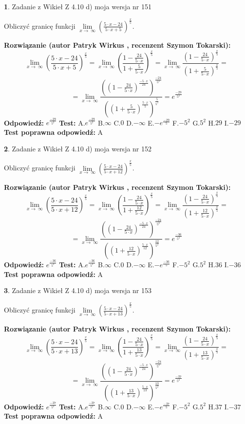 \documentclass[12pt, a4paper]{article}
\theoremstyle{definition} %
\newtheorem{zad}{}
\newcommand{\zadStart}[1]{\begin{zad}#1\newline}
\newcommand{\zadStop}{\end{zad}}
\newcommand{\rozwStart}[2]{\noindent \textbf{Rozwiązanie (autor #1 , recenzent #2): }\newline}
\newcommand{\rozwStop}{\newline}
\newcommand{\odpStart}{\noindent \textbf{Odpowiedź:}\newline}
\newcommand{\odpStop}{\newline}
\newcommand{\testStart}{\noindent \textbf{Test:}\newline}
\newcommand{\testStop}{\newline}
\newcommand{\kluczStart}{\noindent \textbf{Test poprawna odpowiedź:}\newline}
\newcommand{\kluczStop}{\newline}
\begin{document}
\zadStart{Zadanie z Wikieł Z 4.10 d) moja wersja nr 151}


Obliczyć granicę funkcji  $\lim\limits_{x\to\ \infty}(\frac{5\cdot x-24}{5\cdot x+5})^{\frac{x}{5}}$.
\zadStop
\rozwStart{Patryk Wirkus}{Szymon Tokarski}
$$\lim\limits_{x\to\ \infty}(\frac{5\cdot x-24}{5\cdot x+5})^{\frac{x}{5}} = \lim\limits_{x\to\ \infty}(\frac{1-\frac{24}{5\cdot x}}{1+\frac{5}{5\cdot x}})^{\frac{x}{5}}=\lim\limits_{x\to\ \infty}\frac{(1-\frac{24}{5\cdot x})^{\frac{x}{5}}}{(1+\frac{5}{5\cdot x})^{\frac{x}{5}}}=$$
$$=\lim\limits_{x\to\ \infty}\frac{((1-\frac{24}{5\cdot x})^{\frac{-5\cdot x}{24}})^{\frac{-24}{5^{2}}}}{((1+\frac{5}{5\cdot x})^{\frac{5\cdot x}{5}})^{\frac{5}{5^{2}}}}=e^{\frac{-29}{5^{2}}}$$
\rozwStop
\odpStart
$e^{\frac{-29}{5^{2}}}$
\odpStop
\testStart
A.$e^{\frac{-29}{5^{2}}}$ B.$\infty$ C.$0$ D.$-\infty$ E.$-e^{\frac{-29}{5}}$
F.$-5^{2}$ G.$5^{2}$
H.$29$
I.$-29$
\testStop
\kluczStart
A
\kluczStop



\zadStart{Zadanie z Wikieł Z 4.10 d) moja wersja nr 152}


Obliczyć granicę funkcji  $\lim\limits_{x\to\ \infty}(\frac{5\cdot x-24}{5\cdot x+12})^{\frac{x}{5}}$.
\zadStop
\rozwStart{Patryk Wirkus}{Szymon Tokarski}
$$\lim\limits_{x\to\ \infty}(\frac{5\cdot x-24}{5\cdot x+12})^{\frac{x}{5}} = \lim\limits_{x\to\ \infty}(\frac{1-\frac{24}{5\cdot x}}{1+\frac{12}{5\cdot x}})^{\frac{x}{5}}=\lim\limits_{x\to\ \infty}\frac{(1-\frac{24}{5\cdot x})^{\frac{x}{5}}}{(1+\frac{12}{5\cdot x})^{\frac{x}{5}}}=$$
$$=\lim\limits_{x\to\ \infty}\frac{((1-\frac{24}{5\cdot x})^{\frac{-5\cdot x}{24}})^{\frac{-24}{5^{2}}}}{((1+\frac{12}{5\cdot x})^{\frac{5\cdot x}{12}})^{\frac{12}{5^{2}}}}=e^{\frac{-36}{5^{2}}}$$
\rozwStop
\odpStart
$e^{\frac{-36}{5^{2}}}$
\odpStop
\testStart
A.$e^{\frac{-36}{5^{2}}}$ B.$\infty$ C.$0$ D.$-\infty$ E.$-e^{\frac{-36}{5}}$
F.$-5^{2}$ G.$5^{2}$
H.$36$
I.$-36$
\testStop
\kluczStart
A
\kluczStop



\zadStart{Zadanie z Wikieł Z 4.10 d) moja wersja nr 153}


Obliczyć granicę funkcji  $\lim\limits_{x\to\ \infty}(\frac{5\cdot x-24}{5\cdot x+13})^{\frac{x}{5}}$.
\zadStop
\rozwStart{Patryk Wirkus}{Szymon Tokarski}
$$\lim\limits_{x\to\ \infty}(\frac{5\cdot x-24}{5\cdot x+13})^{\frac{x}{5}} = \lim\limits_{x\to\ \infty}(\frac{1-\frac{24}{5\cdot x}}{1+\frac{13}{5\cdot x}})^{\frac{x}{5}}=\lim\limits_{x\to\ \infty}\frac{(1-\frac{24}{5\cdot x})^{\frac{x}{5}}}{(1+\frac{13}{5\cdot x})^{\frac{x}{5}}}=$$
$$=\lim\limits_{x\to\ \infty}\frac{((1-\frac{24}{5\cdot x})^{\frac{-5\cdot x}{24}})^{\frac{-24}{5^{2}}}}{((1+\frac{13}{5\cdot x})^{\frac{5\cdot x}{13}})^{\frac{13}{5^{2}}}}=e^{\frac{-37}{5^{2}}}$$
\rozwStop
\odpStart
$e^{\frac{-37}{5^{2}}}$
\odpStop
\testStart
A.$e^{\frac{-37}{5^{2}}}$ B.$\infty$ C.$0$ D.$-\infty$ E.$-e^{\frac{-37}{5}}$
F.$-5^{2}$ G.$5^{2}$
H.$37$
I.$-37$
\testStop
\kluczStart
A
\kluczStop
\end{document}
